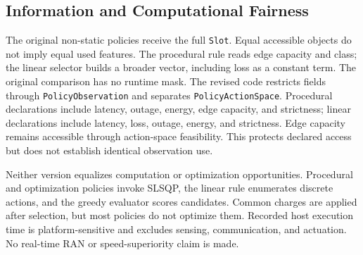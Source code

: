 \documentclass[letterpaper,journal]{IEEEtran}
\newcommand{\pol}[1]{\texttt{#1}}
\begin{document}
\subsection{Information and Computational Fairness}
The original non-static policies receive the full \pol{Slot}. Equal accessible objects do not imply equal used features. The procedural rule reads edge capacity and class; the linear selector builds a broader vector, including loss as a constant term. The original comparison has no runtime mask. The revised code restricts fields through \pol{PolicyObservation} and separates \pol{PolicyActionSpace}. Procedural declarations include latency, outage, energy, edge capacity, and strictness; linear declarations include latency, loss, outage, energy, and strictness. Edge capacity remains accessible through action-space feasibility. This protects declared access but does not establish identical observation use.

Neither version equalizes computation or optimization opportunities. Procedural and optimization policies invoke SLSQP, the linear rule enumerates discrete actions, and the greedy evaluator scores candidates. Common charges are applied after selection, but most policies do not optimize them. Recorded host execution time is platform-sensitive and excludes sensing, communication, and actuation. No real-time RAN or speed-superiority claim is made.




\end{document}
